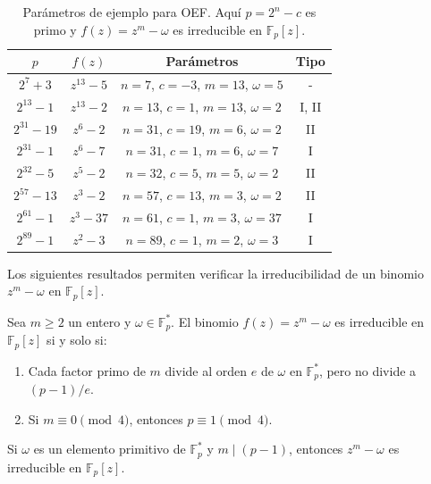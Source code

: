 \begin{table}[H]
  \centering
  \begin{tabular}{cccc}
    \hline
    \(p\)               & \(f(z)\)       & Parámetros                 & Tipo     \\
    \hline
    \(2^7+3\)          & \(z^{13}-5\)   & \(n=7\), \(c=-3\), \(m=13\), \(\omega=5\)   & -        \\
    \(2^{13}-1\)       & \(z^{13}-2\)   & \(n=13\), \(c=1\), \(m=13\), \(\omega=2\)   & I, II    \\
    \(2^{31}-19\)      & \(z^{6}-2\)    & \(n=31\), \(c=19\), \(m=6\), \(\omega=2\)    & II       \\
    \(2^{31}-1\)       & \(z^{6}-7\)    & \(n=31\), \(c=1\), \(m=6\), \(\omega=7\)     & I        \\
    \(2^{32}-5\)       & \(z^{5}-2\)    & \(n=32\), \(c=5\), \(m=5\), \(\omega=2\)     & II       \\
    \(2^{57}-13\)      & \(z^{3}-2\)    & \(n=57\), \(c=13\), \(m=3\), \(\omega=2\)    & II       \\
    \(2^{61}-1\)       & \(z^{3}-37\)   & \(n=61\), \(c=1\), \(m=3\), \(\omega=37\)    & I        \\
    \(2^{89}-1\)       & \(z^{2}-3\)    & \(n=89\), \(c=1\), \(m=2\), \(\omega=3\)     & I        \\
    \hline
  \end{tabular}
  \caption{Parámetros de ejemplo para OEF. Aquí \(p=2^n-c\) es primo y \(f(z)=z^m-\omega\) es irreducible en \(\mathbb{F}_p[z]\).}
  \label{tab:oef_params}
\end{table}

Los siguientes resultados permiten verificar la irreducibilidad de un binomio \(z^m-\omega\) en \(\mathbb{F}_p[z]\).

\begin{teorema}\label{thm:irreducibilidad_binomio}
Sea \(m\ge2\) un entero y \(\omega\in\mathbb{F}_p^*\). El binomio \(f(z)=z^m-\omega\) es irreducible en \(\mathbb{F}_p[z]\) si y solo si:
\begin{enumerate}
  \item Cada factor primo de \(m\) divide al orden \(e\) de \(\omega\) en \(\mathbb{F}_p^*\), pero no divide a \((p-1)/e\).
  \item Si \(m\equiv0\pmod4\), entonces \(p\equiv1\pmod4\).
\end{enumerate}
\end{teorema}

\begin{corollary}\label{cor:omega_primitivo}
Si \(\omega\) es un elemento primitivo de \(\mathbb{F}_p^*\) y \(m\mid(p-1)\), entonces \(z^m-\omega\) es irreducible en \(\mathbb{F}_p[z]\).
\end{corollary}

